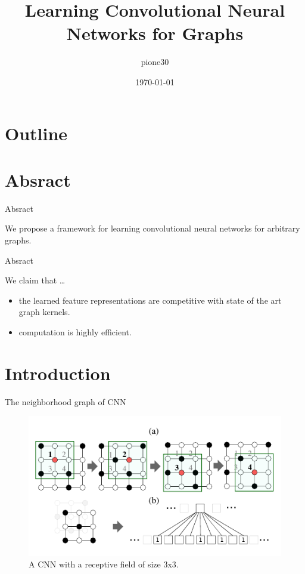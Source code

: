 \documentclass[dvipdfmx]{beamer}
\title{Learning Convolutional Neural Networks for Graphs}
\author{pione30}
\date{\today}
\begin{document}
  \frame[plain]{\titlepage}


\section*{Outline}

  \begin{frame}
    \tableofcontents
  \end{frame}

\section{Absract}

  \begin{frame}{Absract}

    \alert{We propose a framework for learning convolutional neural networks for arbitrary graphs.}
  \end{frame}

  \begin{frame}{Absract}

    \begin{block}{We claim that \dots }
      \begin{itemize}
        \item{the learned feature representations are competitive with state of the art graph kernels.} 
        \item{computation is highly efficient.}
      \end{itemize}
    \end{block}
  \end{frame}

\section{Introduction}

  \begin{frame}{The neighborhood graph of CNN}
    \begin{figure}[h]
      \centering
      \includegraphics[width=0.8\paperwidth]{img/Fig1.pdf}
      \caption{A CNN with a receptive field of size 3x3.}
    \end{figure}
  \end{frame}
\end{document}
